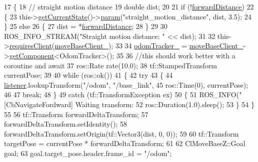 \begin{DoxyCode}
17 \{
18     \textcolor{comment}{// straight motion distance}
19     \textcolor{keywordtype}{double} dist;
20 
21     \textcolor{keywordflow}{if} (!\hyperlink{classmove__base__z__client_1_1CbNavigateForward_ab3097d686b5a82b4f650bc5175d8ab73}{forwardDistance})
22     \{
23         this->\hyperlink{classsmacc_1_1SmaccClientBehavior_abf6773e4dd948f932f11a346dd6e7c2c}{getCurrentState}()->\hyperlink{classsmacc_1_1ISmaccState_a4f2ff8e3eda8aa9bbb60c8ff17d0def1}{param}(\textcolor{stringliteral}{"straight\_motion\_distance"}, dist, 3.5);
24     \}
25     \textcolor{keywordflow}{else}
26     \{
27         dist = *\hyperlink{classmove__base__z__client_1_1CbNavigateForward_ab3097d686b5a82b4f650bc5175d8ab73}{forwardDistance};
28     \}
29 
30     ROS\_INFO\_STREAM(\textcolor{stringliteral}{"Straight motion distance: "} << dist);
31 
32     this->\hyperlink{classsmacc_1_1SmaccClientBehavior_a917f001e763a1059af337bf4e164f542}{requiresClient}(\hyperlink{classmove__base__z__client_1_1CbNavigateForward_ab3b4592cd7f30b490a0549f2ee67c389}{moveBaseClient\_});
33 
34     \hyperlink{classmove__base__z__client_1_1CbNavigateForward_a1472ca04aac37644667e8833668a5bab}{odomTracker\_} = \hyperlink{classmove__base__z__client_1_1CbNavigateForward_ab3b4592cd7f30b490a0549f2ee67c389}{moveBaseClient\_}->\hyperlink{classsmacc_1_1ISmaccClient_adef78db601749ca63c19e74a27cb88cc}{getComponent}<OdomTracker>();
35 
36     \textcolor{comment}{//this should work better with a coroutine and await}
37     ros::Rate rate(10.0);
38     tf::StampedTransform currentPose;
39 
40     \textcolor{keywordflow}{while} (ros::ok())
41     \{
42         \textcolor{keywordflow}{try}
43         \{
44             \hyperlink{classmove__base__z__client_1_1CbNavigateForward_afa40fd805d66eb09e9b4b1bd8356b2a5}{listener}.lookupTransform(\textcolor{stringliteral}{"/odom"}, \textcolor{stringliteral}{"/base\_link"},
45                                      ros::Time(0), currentPose);
46 
47             \textcolor{keywordflow}{break};
48         \}
49         \textcolor{keywordflow}{catch} (tf::TransformException ex)
50         \{
51             ROS\_INFO(\textcolor{stringliteral}{"[CbNavigateFordward] Waiting transform: %
52             ros::Duration(1.0).sleep();
53         \}
54     \}
55 
56     tf::Transform forwardDeltaTransform;
57     forwardDeltaTransform.setIdentity();
58     forwardDeltaTransform.setOrigin(tf::Vector3(dist, 0, 0));
59 
60     tf::Transform targetPose = currentPose * forwardDeltaTransform;
61 
62     ClMoveBaseZ::Goal goal;
63     goal.target\_pose.header.frame\_id = \textcolor{stringliteral}{"/odom"};
}
\end{DoxyCode}
